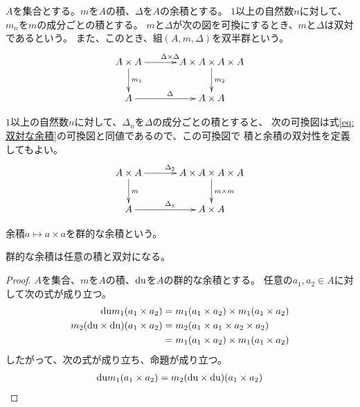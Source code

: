 	\begin{definition}[双半群]\label{def:双半群} %
		$A$を集合とする。$m$を$A$の積、$\Delta$を$A$の余積とする。
		$1$以上の自然数$n$に対して、$m_n$を$m$の成分ごとの積とする。
		$m$と$\Delta$が次の図を可換にするとき、$m$と$\Delta$は双対であるという。
		また、このとき、組$(A,m,\Delta)$を双半群という。
		\begin{equation}\label{eq:双対な余積}\xymatrix@C+2ex{
			A\times A \ar[d]^{m_1} \ar[r]^{\Delta\times \Delta} & A\times A\times A\times A \ar[d]^{m_2} \\
			A \ar[r]^{\Delta} & A\times A \\
		}\end{equation}
	\end{definition} %

	$1$以上の自然数$n$に対して、$\Delta_n$を$\Delta$の成分ごとの積とすると、
	次の可換図は式\eqref{eq:双対な余積}の可換図と同値であるので、この可換図で
	積と余積の双対性を定義してもよい。
	\begin{equation}\xymatrix@C+2ex{
		A\times A \ar[d]^{m} \ar[r]^{\Delta_2} & A\times A\times A\times A \ar[d]^{m\times m} \\
		A \ar[r]^{\Delta_1} & A\times A \\
	}\end{equation}

	\begin{definition}[群的な余積]\label{def:群的な余積} %
		余積$a\mapsto a\times a$を群的な余積という。
	\end{definition} %

	\begin{proposition}[群的な余積の双対性]\label{pro:群的な余積の双対性} %
		群的な余積は任意の積と双対になる。
	\end{proposition} %
	\begin{proof} %
		$A$を集合、$m$を$A$の積、${\operatorname{du}}$を$A$の群的な余積とする。
		任意の$a_1,a_2\in A$に対して次の式が成り立つ。
		\begin{equation*}\begin{split} %
			\mydu m_1(a_1\times a_2) &= m_1(a_1\times a_2)\times m_1(a_1\times a_2) \\
			m_2(\mydu\times \mydu)(a_1\times a_2) &= m_2(a_1\times a_1\times a_2\times a_2) \\
				&= m_1(a_1\times a_2)\times m_1(a_1\times a_2) \\
		\end{split}\end{equation*} %
		したがって、次の式が成り立ち、命題が成り立つ。
		\begin{equation*}\begin{split} %
			\mydu m_1(a_1\times a_2) &= m_2(\mydu\times \mydu)(a_1\times a_2) \\
		\end{split}\end{equation*} %
	\end{proof} %

